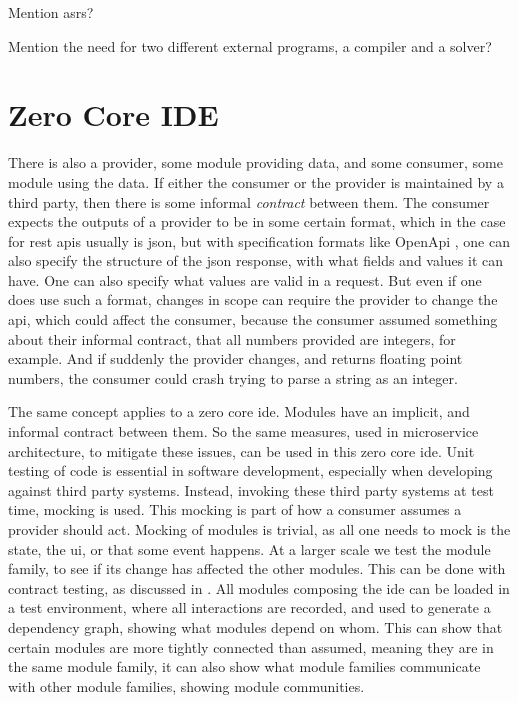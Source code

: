 Mention \gls{asr}s?

Mention the need for two different external programs, a compiler and a solver?

\section{Zero Core IDE}
There is also a provider, some module providing data, and some consumer, some
module using the data. If either the consumer or the provider is maintained by a
third party, then there is some informal \textit{contract} between them. The
consumer expects the outputs of a provider to be in some certain format, which
in the case for \gls{rest} \gls{api}s usually is \gls{json}, but with
specification formats like OpenApi \cite{openApi}, one can also specify the
structure of the \gls{json} response, with what fields and values it can have.
One can also specify what values are valid in a request. But even if one does
use such a format, changes in scope can require the provider to change the
\gls{api}, which could affect the consumer, because the consumer assumed
something about their informal contract, that all numbers provided are
integers, for example. And if suddenly the provider changes, and returns
floating point numbers, the consumer could crash trying to parse a string as
an integer.

The same concept applies to a zero core \gls{ide}. Modules have an implicit, and
informal contract between them. So the same measures, used in microservice
architecture, to mitigate these issues, can be used in this zero core \gls{ide}.
Unit testing of code is essential in software development, especially when
developing against third party systems. Instead, invoking these third party
systems at test time, mocking is used. This mocking is part of how a consumer
assumes a provider should act. Mocking of modules is trivial, as all one needs
to mock is the state, the \gls{ui}, or that some event happens. At a larger
scale we test the module family, to see if its change has affected the other
modules. This can be done with contract testing, as discussed in
\cite{GROSS200322}. All modules composing the \gls{ide} can be loaded in a test
environment, where all interactions are recorded, and used to generate a
dependency graph, showing what modules depend on whom. This can show that
certain modules are more tightly connected than assumed, meaning they are in the
same module family, it can also show what module families communicate with other
module families, showing module communities.
